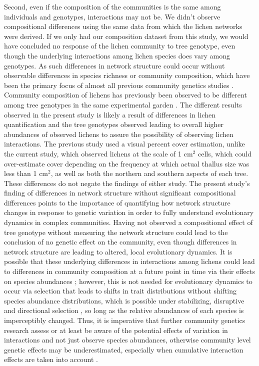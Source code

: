 \documentclass[fleqn,12pt]{olplainarticle}
\begin{document}
Second, even if the composition of the communities is the same among
individuals and genotypes, interactions may not be. We didn't observe
compositional differences using the same data from which the lichen
networks were derived. If we only had our composition dataset from
this study, we would have concluded no response of the lichen
community to tree genotype, even though the underlying interactions
among lichen species does vary among genotypes. As such differences in
network structure could occur without observable differences in
species richness or community composition, which have been the primary
focus of almost all previous community genetics studies
\citep{DesRoches2018TheVariation}. Community composition of lichens
has previously been observed to be different among tree genotypes in
the same experimental garden \citep{Lamit2011, Lamit2015a}. The
different results observed in the present study is likely a result of
differences in lichen quantification and the tree genotypes observed
leading to overall higher abundances of observed lichens to assure the
possibility of observing lichen interactions. The previous study used
a visual percent cover estimation, unlike the current study, which
observed lichens at the scale of 1 cm$^2$ cells, which could
over-estimate cover depending on the frequency at which actual thallus
size was less than 1 cm$^2$, as well as both the northern and southern
aspects of each tree. These differences do not negate the findings of
either study. The present study's finding of differences in network
structure without significant compositional differences points to the
importance of quantifying how network structure changes in response to
genetic variation in order to fully understand evolutionary dynamics
in complex communities. Having not observed a compositional effect of
tree genotype without measuring the network structure could lead to
the conclusion of no genetic effect on the community, even though
differences in network structure are leading to altered, local
evolutionary dynamics. It is possible that these underlying
differences in interactions among lichens could lead to differences in
community composition at a future point in time via their effects on
species abundances \citep{Shuster2006COMMUNITYSTRUCTURE}; however,
this is not needed for evolutionary dynamics to occur via selection
that leads to shifts in trait distributions without shifting species
abundance distributions, which is possible under stabilizing,
disruptive and directional selection \citep{Conner2004ATextbook}, so
long as the relative abundances of each species is imperceptibly
changed. Thus, it is imperative that further community genetics
research assess or at least be aware of the potential effects of
variation in interactions and not just observe species abundances,
otherwise community level genetic effects may be underestimated,
especially when cumulative interaction effects are taken into account
\citep{Borrett2007FunctionalProliferation, Borrett2010}.
\end{document}
